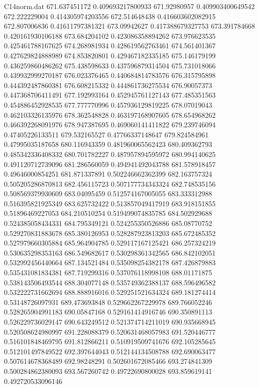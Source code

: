 \begin{filecontents}{C14norm.dat}
671.637451172			0.409693217800933
671.92980957			0.409903400649542
672.222229004			0.414305974203556
672.514648438			0.416603602082915
672.807006836			0.41611797381321
673.09942627			0.417388679327753
673.391784668			0.420161930106188
673.684204102			0.423086358894262
673.976623535			0.425461788167625
674.268981934			0.428619562763461
674.561401367			0.427629824888989
674.853820801			0.429467182335185
675.146179199			0.436259860486262
675.438598633			0.437596879314504
675.731018066			0.439932999270187
676.023376465			0.440684814783576
676.315795898			0.444392487860381
676.608215332			0.444861736275534
676.90057373			0.447368706411491
677.192993164			0.452945761127143
677.485351563			0.454886452928535
677.777770996			0.457936129819225
678.07019043			0.462103326135976
678.362548828			0.463197168907605
678.654968262			0.466392268091976
678.947387695			0.469060141411822
679.239746094			0.47405226133511
679.532165527			0.47766337148647
679.824584961			0.47995035187658
680.116943359			0.481960065562423
680.409362793			0.485342336408332
680.701782227			0.487957894595972
680.994140625			0.491120712739096
681.286560059			0.494941492043788
681.578918457			0.49646000854251
681.871337891			0.502246662362399
682.163757324			0.505205286870813
682.456115723			0.507177734343324
682.748535156			0.508569379930609
683.04095459			0.512574167005055
683.333312988			0.516395821925349
683.625732422			0.513857049417919
683.918151855			0.51896469227053
684.210510254			0.519499074835785
684.502929688			0.524385058434331
684.795349121			0.524255350526886
685.08770752			0.529270831883678
685.380126953			0.528287923813203
685.672485352			0.527979660305884
685.964904785			0.529117167125421
686.257324219			0.530635298353163
686.549682617			0.530298361342565
686.842102051			0.532992456440664
687.134521484			0.535098254382178
687.426879883			0.535431081834381
687.719299316			0.537076118998108
688.01171875			0.538143506493544
688.304077148			0.535749362388137
688.596496582			0.532222731662694
688.888916016			0.529251521634324
689.181274414			0.53148726097931
689.473693848			0.529662267229978
689.766052246			0.528265904991183
690.05847168			0.529161414916746
690.350891113			0.526229736029147
690.643249512			0.521374714211019
690.935668945			0.520508624980997
691.228088379			0.520631468057983
691.520446777			0.516101848469795
691.812866211			0.510919509741676
692.105285645			0.512101497849522
692.397644043			0.512144134508788
692.690063477			0.507614678368489
692.98248291			0.502601672085466
693.274841309			0.500284862380093
693.567260742			0.49722690800028
693.859619141			0.492720533096146

\end{filecontents}
